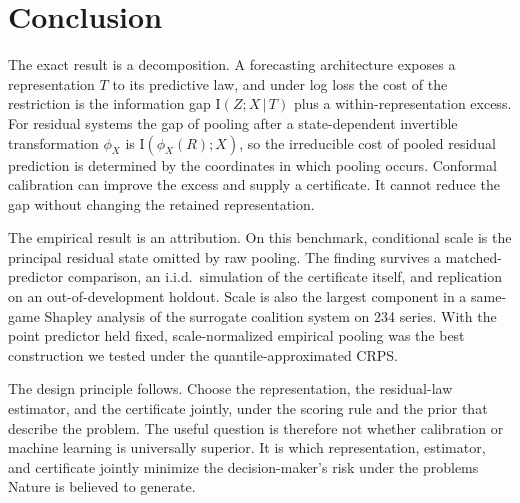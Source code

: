 \documentclass[11pt]{article}
\theoremstyle{remark}
\newcommand{\I}{\mathrm{I}}
\newcommand{\given}{\,|\,}
\begin{document}
\section{Conclusion}\label{sec:conclusion}

The exact result is a decomposition. A forecasting architecture exposes a representation $T$
to its predictive law, and under log loss the cost of the restriction is the information gap
$\I(Z;X\given T)$ plus a within-representation excess. For residual systems the gap of pooling
after a state-dependent invertible transformation $\phi_X$ is $\I(\phi_X(R);X)$, so the
irreducible cost of pooled residual prediction is determined by the coordinates in which
pooling occurs. Conformal calibration can improve the excess and supply a certificate. It cannot reduce
the gap without changing the retained representation.

The empirical result is an attribution. On this benchmark, conditional scale is the principal residual state omitted by raw
pooling. The finding survives a matched-predictor comparison, an i.i.d.\ simulation of the
certificate itself, and replication on an out-of-development holdout. Scale is also the
largest component in a same-game Shapley analysis of the surrogate coalition system on 234
series. With the point predictor held fixed,
scale-normalized empirical pooling was the best construction we tested under the
quantile-approximated CRPS.

The design principle follows. Choose the representation, the residual-law estimator, and the
certificate jointly, under the scoring rule and the prior that describe the problem. The
useful question is therefore not whether calibration or machine learning is universally
superior. It is which representation, estimator, and certificate jointly minimize the
decision-maker's risk under the problems Nature is believed to generate.
\end{document}
